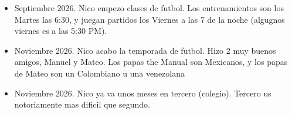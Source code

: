 \documentclass[12pt]{article}
\begin{document}
\begin{itemize}
  \item Septiembre 2026. Nico empezo clases de futbol. Los entrenamientos son los Martes  las 6:30, y juegan partidos los Viernes a las 7 de la noche (algugnos viernes es a las 5:30 PM).
  \item Noviembre 2026. Nico acabo la temporada de futbol. Hizo 2 muy buenos amigos, Manuel y Mateo. Los papas the Manual son Mexicanos, y los papas de Mateo son un Colombiano u una venezolana
  \item Noviembre 2026. Nico ya va unos meses en tercero (colegio). Tercero us notoriamente mas dificil que segundo.

\end{itemize}
\end{document}
